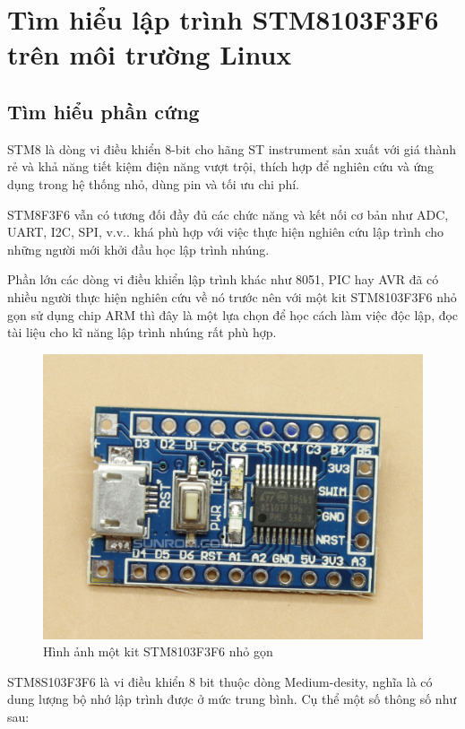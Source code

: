 \section{Tìm hiểu lập trình STM8103F3F6 trên môi trường Linux}
\subsection{Tìm hiểu phần cứng}
STM8 là dòng vi điều khiển 8-bit cho hãng ST instrument sản xuất với giá thành rẻ và khả năng tiết kiệm điện năng vượt trội, thích hợp để nghiên cứu và ứng dụng trong hệ thống nhỏ, dùng pin và tối ưu chi phí.

STM8F3F6 vẫn có tương đối đầy đủ các chức năng và kết nối cơ bản như ADC, UART, I2C, SPI, v.v.. khá phù hợp với việc thực hiện nghiên cứu lập trình cho những người mới khởi đầu học lập trình nhúng.

Phần lớn các dòng vi điều khiển lập trình khác như 8051, PIC hay AVR đã có nhiều người thực hiện nghiên cứu về nó trước nên với một kit STM8103F3F6 nhỏ gọn sử dụng chip ARM thì đây là một lựa chọn để học cách làm việc độc lập, đọc tài liệu cho kĩ năng lập trình nhúng rất phù hợp.

\begin{figure}[!ht]
\centering
\includegraphics[scale=0.2]{images/stm8sf3f6.jpg}
\caption{Hình ảnh một kit STM8103F3F6 nhỏ gọn}
\end{figure}

STM8S103F3F6 là vi điều khiển 8 bit thuộc dòng Medium-desity, nghĩa là có dung lượng bộ nhớ lập trình được ở mức trung bình.
Cụ thể một số thông số như sau:

